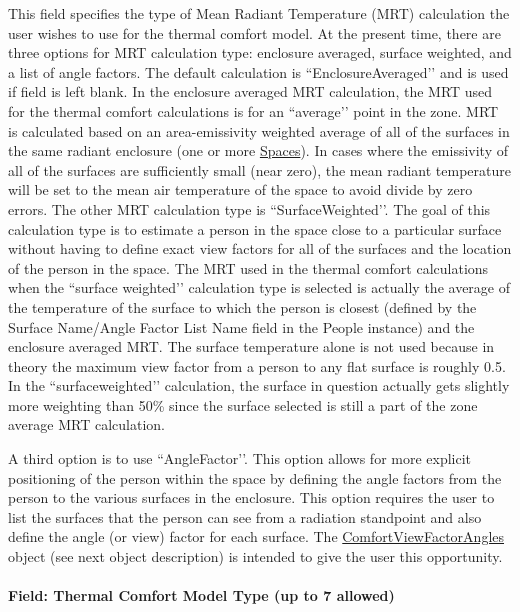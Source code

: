 This field specifies the type of Mean Radiant Temperature (MRT) calculation the user wishes to use for the thermal comfort model. At the present time, there are three options for MRT calculation type: enclosure averaged, surface weighted, and a list of angle factors. The default calculation is ``EnclosureAveraged’’ and is used if field is left blank. In the enclosure averaged MRT calculation, the MRT used for the thermal comfort calculations is for an ``average’’ point in the zone. MRT is calculated based on an area-emissivity weighted average of all of the surfaces in the same radiant enclosure (one or more \hyperref[space]{Spaces}). In cases where the emissivity of all of the surfaces are sufficiently small (near zero), the mean radiant temperature will be set to the mean air temperature of the space to avoid divide by zero errors. The other MRT calculation type is ``SurfaceWeighted’’. The goal of this calculation type is to estimate a person in the space close to a particular surface without having to define exact view factors for all of the surfaces and the location of the person in the space. The MRT used in the thermal comfort calculations when the ``surface weighted’’ calculation type is selected is actually the average of the temperature of the surface to which the person is closest (defined by the Surface Name/Angle Factor List Name field in the People instance) and the enclosure averaged MRT. The surface temperature alone is not used because in theory the maximum view factor from a person to any flat surface is roughly 0.5. In the ``surfaceweighted’’ calculation, the surface in question actually gets slightly more weighting than 50\% since the surface selected is still a part of the zone average MRT calculation.

A third option is to use ``AngleFactor’’. This option allows for more explicit positioning of the person within the space by defining the angle factors from the person to the various surfaces in the enclosure. This option requires the user to list the surfaces that the person can see from a radiation standpoint and also define the angle (or view) factor for each surface. The \hyperref[comfortviewfactorangles]{ComfortViewFactorAngles} object (see next object description) is intended to give the user this opportunity.

\paragraph{Field: Thermal Comfort Model Type (up to 7 allowed)}\label{field-thermal-comfort-model-type-up-to-7-allowed-people-definition}

